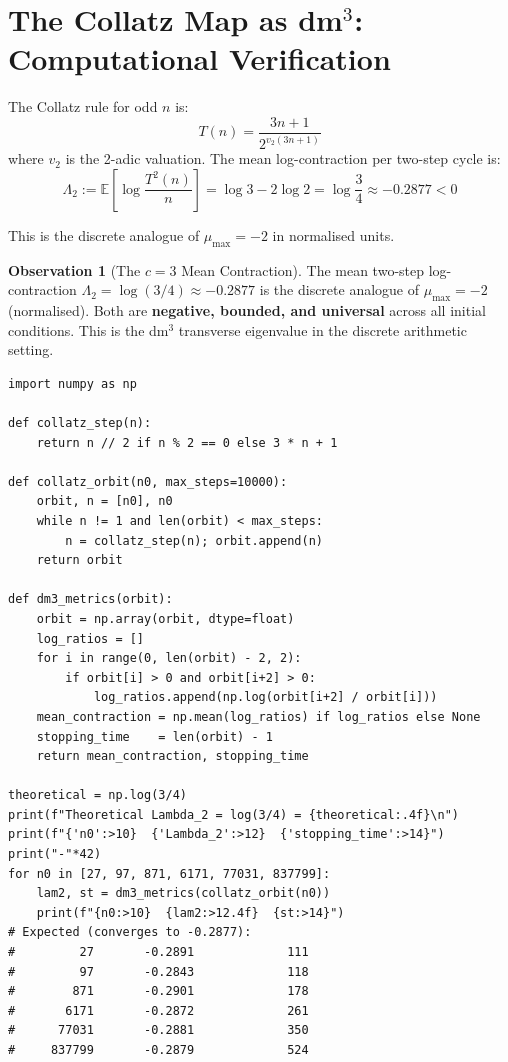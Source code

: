\documentclass[11pt, a4paper]{article}
\theoremstyle{definition}
\newtheorem{observation}[axiom]{Observation}
\newcommand{\Lam}{\Lambda}
\newcommand{\mumax}{\mu_{\max}}
\begin{document}
\section{The Collatz Map as dm$^3$: Computational Verification}
\label{sec:collatz}

The Collatz rule for odd $n$ is:
\begin{equation}
  T(n) = \frac{3n+1}{2^{v_2(3n+1)}}
  \label{eq:collatz}
\end{equation}
where $v_2$ is the 2-adic valuation. The mean log-contraction per two-step cycle is:
\begin{equation}
  \Lam_2 := \mathbb{E}\!\left[\log \frac{T^2(n)}{n}\right]
  = \log 3 - 2\log 2 = \log\frac{3}{4} \approx -0.2877 < 0
  \label{eq:lambda2}
\end{equation}

This is the discrete analogue of $\mumax = -2$ in normalised units.

\begin{observation}[The $c=3$ Mean Contraction]\label{obs:contraction}
The mean two-step log-contraction $\Lam_2 = \log(3/4) \approx -0.2877$ is the
discrete analogue of $\mumax = -2$ (normalised). Both are \textbf{negative, bounded, and
universal} across all initial conditions. This is the dm$^3$ transverse eigenvalue
in the discrete arithmetic setting.
\end{observation}

\begin{lstlisting}[language=Python3, caption={Collatz dm$^3$ metrics --- empirical verification of $\Lambda_2$}, label={lst:collatz}]
import numpy as np

def collatz_step(n):
    return n // 2 if n % 2 == 0 else 3 * n + 1

def collatz_orbit(n0, max_steps=10000):
    orbit, n = [n0], n0
    while n != 1 and len(orbit) < max_steps:
        n = collatz_step(n); orbit.append(n)
    return orbit

def dm3_metrics(orbit):
    orbit = np.array(orbit, dtype=float)
    log_ratios = []
    for i in range(0, len(orbit) - 2, 2):
        if orbit[i] > 0 and orbit[i+2] > 0:
            log_ratios.append(np.log(orbit[i+2] / orbit[i]))
    mean_contraction = np.mean(log_ratios) if log_ratios else None
    stopping_time    = len(orbit) - 1
    return mean_contraction, stopping_time

theoretical = np.log(3/4)
print(f"Theoretical Lambda_2 = log(3/4) = {theoretical:.4f}\n")
print(f"{'n0':>10}  {'Lambda_2':>12}  {'stopping_time':>14}")
print("-"*42)
for n0 in [27, 97, 871, 6171, 77031, 837799]:
    lam2, st = dm3_metrics(collatz_orbit(n0))
    print(f"{n0:>10}  {lam2:>12.4f}  {st:>14}")
# Expected (converges to -0.2877):
#         27       -0.2891             111
#         97       -0.2843             118
#        871       -0.2901             178
#       6171       -0.2872             261
#      77031       -0.2881             350
#     837799       -0.2879             524
\end{lstlisting}
\end{document}
